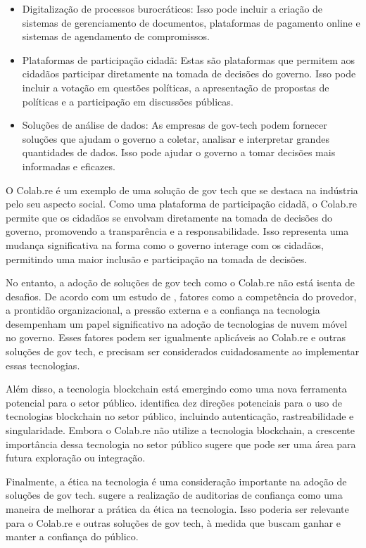 \begin{itemize}
	\item Digitalização de processos burocráticos: Isso pode incluir a criação de sistemas de gerenciamento de documentos, plataformas de pagamento online e sistemas de agendamento de compromissos.
	\item Plataformas de participação cidadã: Estas são plataformas que permitem aos cidadãos participar diretamente na tomada de decisões do governo. Isso pode incluir a votação em questões políticas, a apresentação de propostas de políticas e a participação em discussões públicas.
	\item Soluções de análise de dados: As empresas de gov-tech podem fornecer soluções que ajudam o governo a coletar, analisar e interpretar grandes quantidades de dados. Isso pode ajudar o governo a tomar decisões mais informadas e eficazes.
\end{itemize}

O Colab.re é um exemplo de uma solução de gov tech que se destaca na indústria pelo seu aspecto social. Como uma plataforma de participação cidadã, o Colab.re permite que os cidadãos se envolvam diretamente na tomada de decisões do governo, promovendo a transparência e a responsabilidade. Isso representa uma mudança significativa na forma como o governo interage com os cidadãos, permitindo uma maior inclusão e participação na tomada de decisões.

No entanto, a adoção de soluções de gov tech como o Colab.re não está isenta de desafios. De acordo com um estudo de , fatores como a competência do provedor, a prontidão organizacional, a pressão externa e a confiança na tecnologia desempenham um papel significativo na adoção de tecnologias de nuvem móvel no governo. Esses fatores podem ser igualmente aplicáveis ao Colab.re e outras soluções de gov tech, e precisam ser considerados cuidadosamente ao implementar essas tecnologias.

Além disso, a tecnologia blockchain está emergindo como uma nova ferramenta potencial para o setor público.  identifica dez direções potenciais para o uso de tecnologias blockchain no setor público, incluindo autenticação, rastreabilidade e singularidade. Embora o Colab.re não utilize a tecnologia blockchain, a crescente importância dessa tecnologia no setor público sugere que pode ser uma área para futura exploração ou integração.

Finalmente, a ética na tecnologia é uma consideração importante na adoção de soluções de gov tech.  sugere a realização de auditorias de confiança como uma maneira de melhorar a prática da ética na tecnologia. Isso poderia ser relevante para o Colab.re e outras soluções de gov tech, à medida que buscam ganhar e manter a confiança do público.

